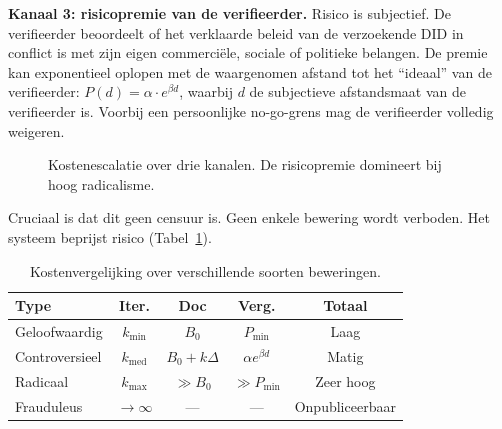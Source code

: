 \documentclass[11pt,a4paper,twocolumn]{article}
\begin{document}
\textbf{Kanaal 3: risicopremie van de verifieerder.} Risico is subjectief. De verifieerder beoordeelt of het verklaarde beleid van de verzoekende DID in conflict is met zijn eigen commerciële, sociale of politieke belangen. De premie kan exponentieel oplopen met de waargenomen afstand tot het ``ideaal'' van de verifieerder: $P(d) = \alpha \cdot e^{\beta d}$, waarbij $d$ de subjectieve afstandsmaat van de verifieerder is. Voorbij een persoonlijke no-go-grens mag de verifieerder volledig weigeren.

\begin{figure}[ht]
\centering
{}
\caption{Kostenescalatie over drie kanalen. De risicopremie domineert bij hoog radicalisme.}
\label{fig:radicalism}
\end{figure}

Cruciaal is dat dit geen censuur is. Geen enkele bewering wordt verboden. Het systeem beprijst risico (Tabel~\ref{tab:costs}).

\begin{table}[ht]
\centering
\caption{Kostenvergelijking over verschillende soorten beweringen.}
\label{tab:costs}
\footnotesize
\begin{tabular}{@{}lcccc@{}}
\toprule
\textbf{Type} & \textbf{Iter.} & \textbf{Doc} & \textbf{Verg.} & \textbf{Totaal} \\
\midrule
Geloofwaardig & $k_{\min}$ & $B_0$ & $P_{\min}$ & Laag \\
Controversieel & $k_{\text{med}}$ & $B_0{+}k\Delta$ & $\alpha e^{\beta d}$ & Matig \\
Radicaal & $k_{\max}$ & $\gg B_0$ & $\gg P_{\min}$ & Zeer hoog \\
Frauduleus & $\to\infty$ & --- & --- & Onpubliceerbaar \\
\bottomrule
\end{tabular}
\end{table}
\end{document}
